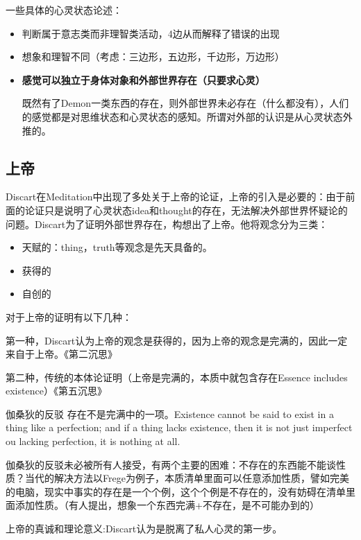 \documentclass{ctexart}
\begin{document}
一些具体的心灵状态论述：

\begin{itemize}
    \item 判断属于意志类而非理智类活动，4边从而解释了错误的出现
    \item 想象和理智不同（考虑：三边形，五边形，千边形，万边形）
    \item \textbf{感觉可以独立于身体对象和外部世界存在（只要求心灵）}
    
    既然有了Demon一类东西的存在，则外部世界未必存在（什么都没有），人们的感觉都是对思维状态和心灵状态的感知。所谓对外部的认识是从心灵状态外推的。
\end{itemize}

\subsection{上帝}

Discart在Meditation中出现了多处关于上帝的论证，上帝的引入是必要的：由于前面的论证只是说明了心灵状态idea和thought的存在，无法解决外部世界怀疑论的问题。Discart为了证明外部世界存在，构想出了上帝。他将观念分为三类：

\begin{itemize}
    \item 天赋的：thing，truth等观念是先天具备的。
    \item 获得的
    \item 自创的
\end{itemize}

对于上帝的证明有以下几种：

第一种，Discart认为上帝的观念是获得的，因为上帝的观念是完满的，因此一定来自于上帝。《第二沉思》

第二种，传统的本体论证明（上帝是完满的，本质中就包含存在Essence includes existence）《第五沉思》

\begin{fancybox}{伽桑狄的反驳}
    存在不是完满中的一项。Existence cannot be said to exist in a thing like a perfection; and if a thing lacks existence, then it is not just imperfect ou lacking perfection, it is nothing at all.
\end{fancybox}

伽桑狄的反驳未必被所有人接受，有两个主要的困难：不存在的东西能不能谈性质？当代的解决方法以Frege为例子，本质清单里面可以任意添加性质，譬如完美的电脑，现实中事实的存在是一个个例，这个个例是不存在的，没有妨碍在清单里面添加性质。（有人提出，想象一个东西完满+不存在，是不可能办到的）

上帝的真诚和理论意义:Discart认为是脱离了私人心灵的第一步。
\end{document}
